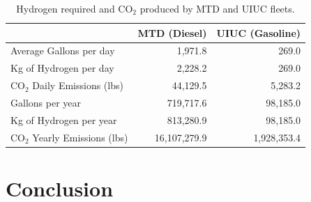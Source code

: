 \documentclass{anstrans}
\begin{document}
\begin{table}[]
	\centering
    \caption{Hydrogen required and CO$_2$ produced by MTD and UIUC fleets.}
    \label{tab:h2req}
\begin{tabular}{l|rr}
\hline
                              & MTD (Diesel)     & UIUC (Gasoline)  \\ \hline
Average Gallons per day       & 1,971.8          & 269.0            \\
Kg of Hydrogen per day        & 2,228.2          & 269.0            \\
CO$_2$ Daily Emissions (lbs)  & 44,129.5         & 5,283.2          \\
Gallons per year              & 719,717.6        & 98,185.0         \\
Kg of Hydrogen per year       & 813,280.9        & 98,185.0         \\
CO$_2$ Yearly Emissions (lbs) & 16,107,279.9     & 1,928,353.4      \\ \hline
\end{tabular}
\end{table}

\section{Conclusion}



\end{document}
